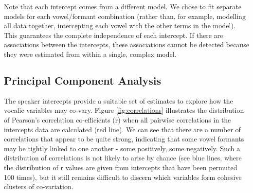 \documentclass[review]{elsarticle} %
\begin{document}
Note that each intercept comes from a different model.  We chose to fit separate models for each vowel/formant combination (rather than, for example, modelling all data together, intercepting each vowel with the other terms in the model). This guarantees the complete independence of each intercept.  If there are associations between the intercepts, these associations cannot be detected because they were estimated from within a single, complex model.

\subsection{Principal Component Analysis}

The speaker intercepts provide a suitable set of estimates to explore how the vocalic variables may co-vary. Figure \ref{fig:correlations} illustrates the distribution of Pearson's correlation co-efficients (r) when all pairwise correlations in the intercepts data are calculated (red line). We can see that there are a number of correlations that appear to be quite strong, indicating that some vowel formants may be tightly linked to one another - some positively, some negatively. Such a distribution of correlations is not likely to arise by chance (see blue lines, where the distribution of r values are given from intercepts that have been permuted 100 times), but it still remains difficult to discern which variables form cohesive clusters of co-variation.



\end{document}
